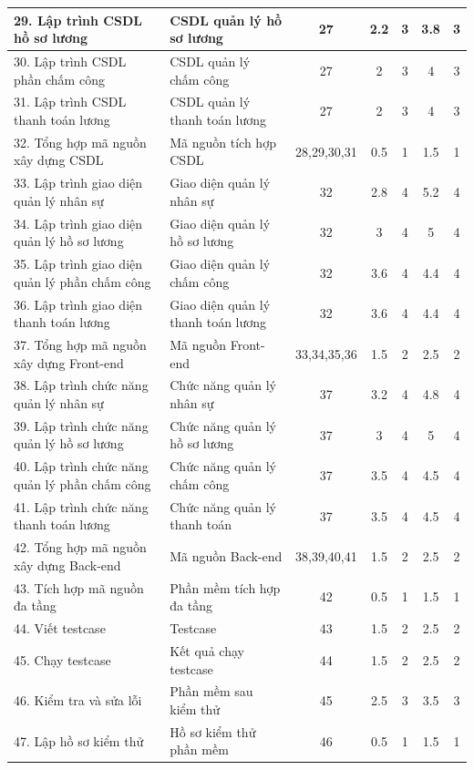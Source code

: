 \begin{longtable}{|p{5cm}|p{5cm}|c|c|c|c|c|}
    29. Lập trình CSDL hồ sơ lương & CSDL quản lý hồ sơ lương & 27 & 2.2 & 3 & 3.8 & 3 \\ \hline
    30. Lập trình CSDL phần chấm công & CSDL quản lý chấm công & 27 & 2 & 3 & 4 & 3 \\ \hline
    31. Lập trình CSDL thanh toán lương & CSDL quản lý thanh toán lương & 27 & 2 & 3 & 4 & 3 \\ \hline
    32. Tổng hợp mã nguồn xây dựng CSDL & Mã nguồn tích hợp CSDL & 28,29,30,31 & 0.5 & 1 & 1.5 & 1 \\ \hline
    33. Lập trình giao diện quản lý nhân sự & Giao diện quản lý nhân sự & 32 & 2.8 & 4 & 5.2 & 4 \\ \hline
    34. Lập trình giao diện quản lý hồ sơ lương & Giao diện quản lý hồ sơ lương & 32 & 3 & 4 & 5 & 4 \\ \hline
    35. Lập trình giao diện quản lý phần chấm công & Giao diện quản lý chấm công & 32 & 3.6 & 4 & 4.4 & 4 \\ \hline
    36. Lập trình giao diện thanh toán lương & Giao diện quản lý thanh toán lương & 32 & 3.6 & 4 & 4.4 & 4 \\ \hline
    37. Tổng hợp mã nguồn xây dựng Front-end & Mã nguồn Front-end & 33,34,35,36 & 1.5 & 2 & 2.5 & 2 \\ \hline
    38. Lập trình chức năng quản lý nhân sự & Chức năng quản lý nhân sự & 37 & 3.2 & 4 & 4.8 & 4 \\ \hline
    39. Lập trình chức năng quản lý hồ sơ lương & Chức năng quản lý hồ sơ lương & 37 & 3 & 4 & 5 & 4 \\ \hline
    40. Lập trình chức năng quản lý phần chấm công & Chức năng quản lý chấm công & 37 & 3.5 & 4 & 4.5 & 4 \\ \hline
    41. Lập trình chức năng thanh toán lương & Chức năng quản lý thanh toán & 37 & 3.5 & 4 & 4.5 & 4 \\ \hline
    42. Tổng hợp mã nguồn xây dựng Back-end & Mã nguồn Back-end & 38,39,40,41 & 1.5 & 2 & 2.5 & 2 \\ \hline
    43. Tích hợp mã nguồn đa tầng & Phần mềm tích hợp đa tầng & 42 & 0.5 & 1 & 1.5 & 1 \\ \hline
    44. Viết testcase & Testcase & 43 & 1.5 & 2 & 2.5 & 2 \\ \hline
    45. Chạy testcase & Kết quả chạy testcase & 44 & 1.5 & 2 & 2.5 & 2 \\ \hline
    46. Kiểm tra và sửa lỗi & Phần mềm sau kiểm thử & 45 & 2.5 & 3 & 3.5 & 3 \\ \hline
    47. Lập hồ sơ kiểm thử & Hồ sơ kiểm thử phần mềm & 46 & 0.5 & 1 & 1.5 & 1 \\ \hline

\end{longtable}
